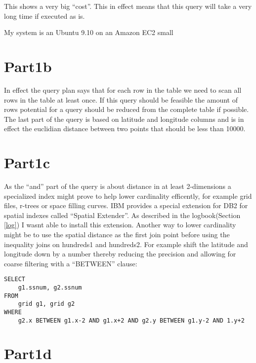 This shows a very big ``cost''. This
in effect means that this query will take a very long time if executed as is.

My system is an Ubuntu 9.10 on an Amazon EC2 small
\section{Part1b}
In effect the query plan says that for each row in the table we need to scan all
rows in the table at least once. If this query should be feasible the amount of
rows potential for a query should be reduced from the complete table if
possible. The last part of the query is based on latitude and longitude columns
and is in effect the euclidian distance between two points that should be less
than 10000.

\section{Part1c}
As the ``and'' part of the query is about distance in at least 2-dimensions a
specialized index might prove to help lower cardinality efficently, for example
grid files, r-trees or space filling curves. IBM provides a special extension
for DB2 for spatial indexes called ``Spatial Extender''. As described in the
logbook(Section \ref{log}) I wasnt able to install this extension. Another way
to lower cardinality might be to use the spatial distance as the first join
point before using the inequality joins on hundreds1 and hundreds2. 
For example shift the latitude and longitude down by a number thereby reducing
the precision and allowing for coarse filtering  with a ``BETWEEN'' clause:
\begin{verbatim}
SELECT
    g1.ssnum, g2.ssnum
FROM
    grid g1, grid g2
WHERE
    g2.x BETWEEN g1.x-2 AND g1.x+2 AND g2.y BETWEEN g1.y-2 AND 1.y+2 
\end{verbatim}

\section{Part1d}

